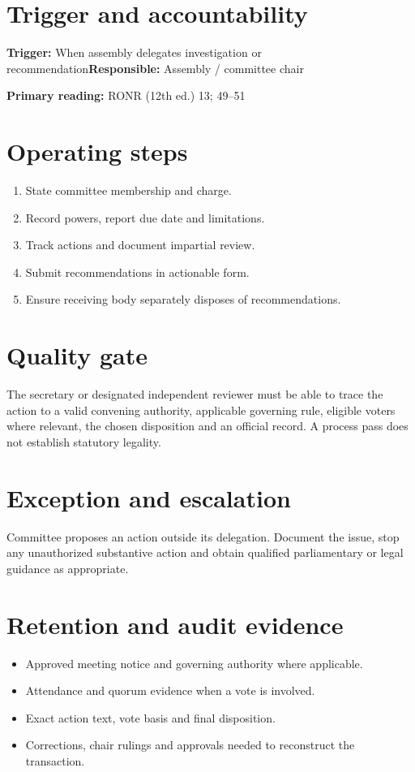 \documentclass[11pt]{article}
\begin{document}
\SuiteOpen
{}
\section{Trigger and accountability}
\textbf{Trigger:} When assembly delegates investigation or recommendation\quad\textbf{Responsible:} Assembly / committee chair

\textbf{Primary reading:} RONR (12th ed.) 13; 49--51

\section{Operating steps}
\begin{enumerate}[leftmargin=*,itemsep=4pt]
\item State committee membership and charge.
\item Record powers, report due date and limitations.
\item Track actions and document impartial review.
\item Submit recommendations in actionable form.
\item Ensure receiving body separately disposes of recommendations.
\end{enumerate}

\section{Quality gate}
The secretary or designated independent reviewer must be able to trace the action to a valid convening authority, applicable governing rule, eligible voters where relevant, the chosen disposition and an official record. A process pass does not establish statutory legality.

\section{Exception and escalation}
Committee proposes an action outside its delegation. Document the issue, stop any unauthorized substantive action and obtain qualified parliamentary or legal guidance as appropriate.

\section{Retention and audit evidence}
\begin{itemize}[leftmargin=*,itemsep=4pt]
\item Approved meeting notice and governing authority where applicable.
\item Attendance and quorum evidence when a vote is involved.
\item Exact action text, vote basis and final disposition.
\item Corrections, chair rulings and approvals needed to reconstruct the transaction.
\end{itemize}
\end{document}
